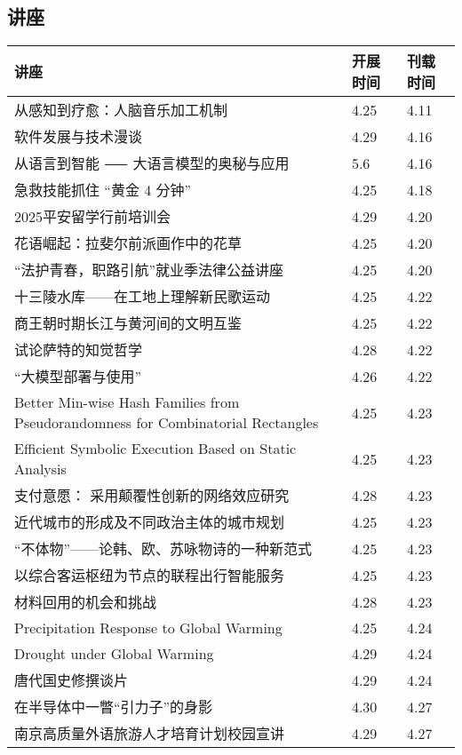 \documentclass[letterpaper, 12pt]{article}
\begin{document}
\begin{multicols}{2}
\pagebreak

\section{讲座}
\begin{tabular}{|>{\centering\arraybackslash}m{}|m{}|m{}|}
    \hline
    讲座 & 开展时间 & 刊载时间\\
    \hline\hline
    从感知到疗愈：人脑音乐加工机制 & 4.25 & 4.11\\\hline
    软件发展与技术漫谈 & 4.29 & 4.16\\\hline
    从语言到智能 ⸺ 大语言模型的奥秘与应用 & 5.6 & 4.16\\\hline
    急救技能抓住 “黄金 4 分钟” & 4.25 & 4.18\\\hline
    2025平安留学行前培训会 & 4.29 & 4.20\\\hline
    花语崛起：拉斐尔前派画作中的花草 & 4.25 & 4.20\\\hline
    “法护青春，职路引航”就业季法律公益讲座 & 4.25 & 4.20\\\hline
    十三陵水库——在工地上理解新民歌运动 & 4.25 & 4.22\\\hline
    商王朝时期长江与黄河间的文明互鉴 & 4.25 & 4.22\\\hline
    试论萨特的知觉哲学 & 4.28 & 4.22\\\hline
    “大模型部署与使用” & 4.26 & 4.22\\\hline
    Better Min-wise Hash Families from Pseudorandomness for Combinatorial Rectangles & 4.25 & 4.23\\\hline
    Efficient Symbolic Execution Based on Static Analysis & 4.25 & 4.23\\\hline
    支付意愿： 采用颠覆性创新的网络效应研究 & 4.28 & 4.23\\\hline
    近代城市的形成及不同政治主体的城市规划 & 4.25 & 4.23\\\hline
    “不体物”——论韩、欧、苏咏物诗的一种新范式 & 4.25 & 4.23\\\hline
    以综合客运枢纽为节点的联程出行智能服务 & 4.25 & 4.23\\\hline
    材料回用的机会和挑战 & 4.28 & 4.23\\\hline
    Precipitation Response to Global Warming & 4.25 & 4.24\\\hline
    Drought under Global Warming & 4.29 & 4.24\\\hline
    唐代国史修撰谈片 & 4.29 & 4.24\\\hline
    在半导体中一瞥“引力子”的身影 & 4.30 & 4.27\\\hline
    南京高质量外语旅游人才培育计划校园宣讲 & 4.29 & 4.27\\\hline
\end{tabular}

\end{multicols}
\end{document}
